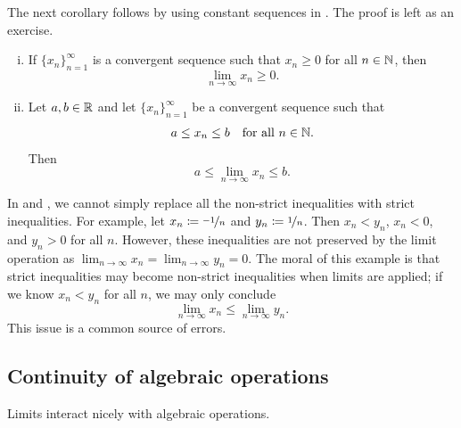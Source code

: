 The next corollary follows by
using constant sequences in
.  The proof is left as an exercise.

\begin{samepage}
\begin{cor} \label{limandineq:cor}
\leavevmode
\begin{enumerate}[(i)]
\item If $\{ x_n \}_{n=1}^\infty$ is a convergent sequence such that $x_n \geq 0$ for all
$n \in {\mathbb{N}}$,
then
\begin{equation*}
\lim_{n\to\infty} x_n \geq 0.
\end{equation*}
\item
Let $a,b \in {\mathbb{R}}$ and
let $\{ x_n \}_{n=1}^\infty$ be a convergent sequence such that
\begin{equation*}
a \leq x_n \leq b \quad \text{for all } n \in {\mathbb{N}} .
\end{equation*}
Then
\begin{equation*}
a \leq \lim_{n\to\infty} x_n \leq b.
\end{equation*}
\end{enumerate}
\end{cor}
\end{samepage}

In  and , we cannot simply replace
all the non-strict inequalities with
strict inequalities.  For example,
let $x_n \coloneqq \nicefrac{-1}{n}$ and $y_n \coloneqq \nicefrac{1}{n}$.
Then $x_n < y_n$, $x_n < 0$,
and $y_n > 0$ for all $n$.  However, these inequalities are
not preserved by the limit operation as
$\lim_{n\to\infty} x_n = \lim_{n\to\infty} y_n = 0$.
The moral of this example is that strict inequalities may become non-strict
inequalities when limits are applied; if we know
$x_n < y_n$ for all $n$,
we may only conclude 
\begin{equation*}
\lim_{n \to \infty} x_n \leq
\lim_{n \to \infty} y_n .
\end{equation*}
This issue is a common source of errors.

\subsection{Continuity of algebraic operations}

Limits interact nicely with algebraic operations.

